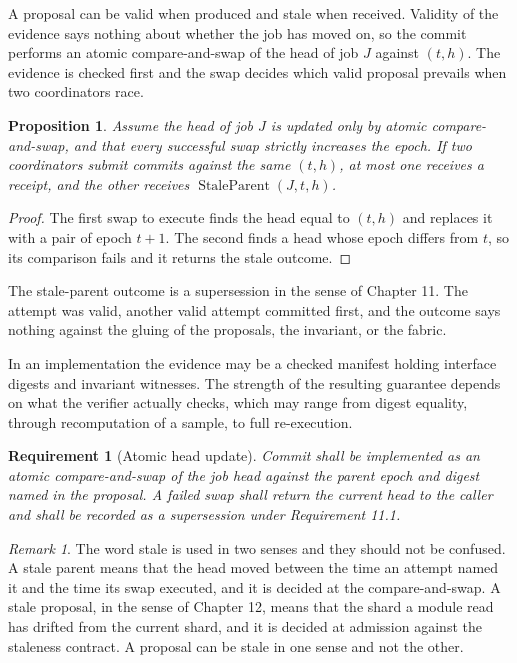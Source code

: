 \documentclass[11pt,openany]{book}
\newtheorem{proposition}{Proposition}[chapter]
\newtheorem{requirement}{Requirement}[chapter]
\theoremstyle{remark}
\newtheorem{remark}{Remark}[chapter]
\begin{document}
A proposal can be valid when produced and stale when received. Validity of the evidence says nothing about whether the job has moved on, so the commit performs an atomic compare-and-swap of the head of job $J$ against $(t,h)$. The evidence is checked first and the swap decides which valid proposal prevails when two coordinators race.

\begin{proposition}\label{prop:onewinner}
Assume the head of job $J$ is updated only by atomic compare-and-swap, and that every successful swap strictly increases the epoch. If two coordinators submit commits against the same $(t,h)$, at most one receives a receipt, and the other receives $\operatorname{StaleParent}(J,t,h)$.
\end{proposition}
\begin{proof}
The first swap to execute finds the head equal to $(t,h)$ and replaces it with a pair of epoch $t+1$. The second finds a head whose epoch differs from $t$, so its comparison fails and it returns the stale outcome.
\end{proof}

The stale-parent outcome is a supersession in the sense of Chapter 11. The attempt was valid, another valid attempt committed first, and the outcome says nothing against the gluing of the proposals, the invariant, or the fabric.


In an implementation the evidence may be a checked manifest holding interface digests and invariant witnesses. The strength of the resulting guarantee depends on what the verifier actually checks, which may range from digest equality, through recomputation of a sample, to full re-execution.

\begin{requirement}[Atomic head update]
Commit shall be implemented as an atomic compare-and-swap of the job head against the parent epoch and digest named in the proposal. A failed swap shall return the current head to the caller and shall be recorded as a supersession under Requirement 11.1.
\end{requirement}

\begin{remark}
The word stale is used in two senses and they should not be confused. A stale parent means that the head moved between the time an attempt named it and the time its swap executed, and it is decided at the compare-and-swap. A stale proposal, in the sense of Chapter 12, means that the shard a module read has drifted from the current shard, and it is decided at admission against the staleness contract. A proposal can be stale in one sense and not the other.
\end{remark}
\end{document}

